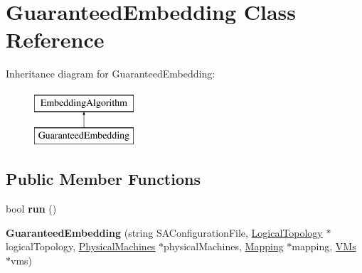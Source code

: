 \hypertarget{classGuaranteedEmbedding}{\section{\-Guaranteed\-Embedding \-Class \-Reference}
\label{classGuaranteedEmbedding}
}
\-Inheritance diagram for \-Guaranteed\-Embedding\-:\begin{figure}[H]
\begin{center}
\leavevmode
\includegraphics[height=2.000000cm]{classGuaranteedEmbedding}
\end{center}
\end{figure}
\subsection*{\-Public \-Member \-Functions}
\begin{DoxyCompactItemize}
\item 
\hypertarget{classGuaranteedEmbedding_a2a450239b93cfb1d981bffe377b98c19}{bool {\bfseries run} ()}\label{classGuaranteedEmbedding_a2a450239b93cfb1d981bffe377b98c19}

\item 
\hypertarget{classGuaranteedEmbedding_a294060872d5a34d21d8a28fca95e3478}{{\bfseries \-Guaranteed\-Embedding} (string \-S\-A\-Configuration\-File, \hyperlink{classLogicalTopology}{\-Logical\-Topology} $\ast$logical\-Topology, \hyperlink{classPhysicalMachines}{\-Physical\-Machines} $\ast$physical\-Machines, \hyperlink{classMapping}{\-Mapping} $\ast$mapping, \hyperlink{classVMs}{\-V\-Ms} $\ast$vms)}\label{classGuaranteedEmbedding_a294060872d5a34d21d8a28fca95e3478}

\end{DoxyCompactItemize}
